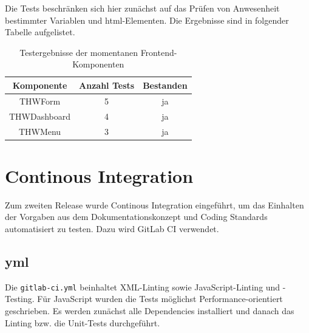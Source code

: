 \documentclass[a4paper,11pt,oneside, titlepage]{article}
\begin{document}
      Die Tests beschränken sich hier zunächst auf das Prüfen von Anwesenheit bestimmter Variablen und html-Elementen.
      Die Ergebnisse sind in folgender Tabelle aufgelistet.

      \begin{table}[htpb]
        \centering
        \label{tab:test}
        \begin{tabular}{c | c | c}
          Komponente & Anzahl Tests & Bestanden \\
          \hline
          THWForm & 5 & ja \\
          THWDashboard & 4 & ja \\
          THWMenu & 3 & ja 
        \end{tabular}
        \caption{Testergebnisse der momentanen Frontend-Komponenten}
      \end{table}
  
  \newpage

 \section{Continous Integration}
 \label{sub:continous integration}
  
  Zum zweiten Release wurde Continous Integration eingeführt, um das Einhalten der Vorgaben aus dem Dokumentationskonzept und Coding Standards automatisiert zu testen. Dazu wird \gls{GitLab CI} verwendet.
  
  	\subsection{yml}
  	\label{yml}
  	 Die \verb+gitlab-ci.yml+ beinhaltet XML-Linting sowie JavaScript-Linting und -Testing.
  	 Für JavaScript wurden die Tests möglichst Performance-orientiert geschrieben. Es werden zunächst alle Dependencies installiert und danach das Linting bzw. die Unit-Tests durchgeführt.

      
      \printglossaries
  
\end{document}
